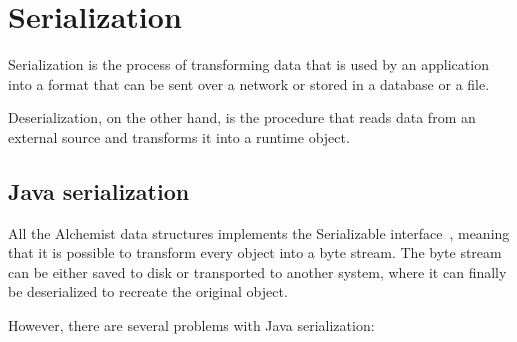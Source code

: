 \section{Serialization}
\label{sec:serialization}
Serialization is the process of transforming data that is used by an application into a format that can be sent over a network or stored in a database or a file.

Deserialization, on the other hand, is the procedure that reads data from an external source and transforms it into a runtime object.

\subsection{Java serialization}
\label{ssec:java-serialization}
All the Alchemist data structures implements the Serializable interface~\cite{Serializ95:online}, meaning that it is possible to transform every object into a byte stream. The byte stream can be either saved to disk or transported to another system, where it can finally be deserialized to recreate the original object.

However, there are several problems with Java serialization:

